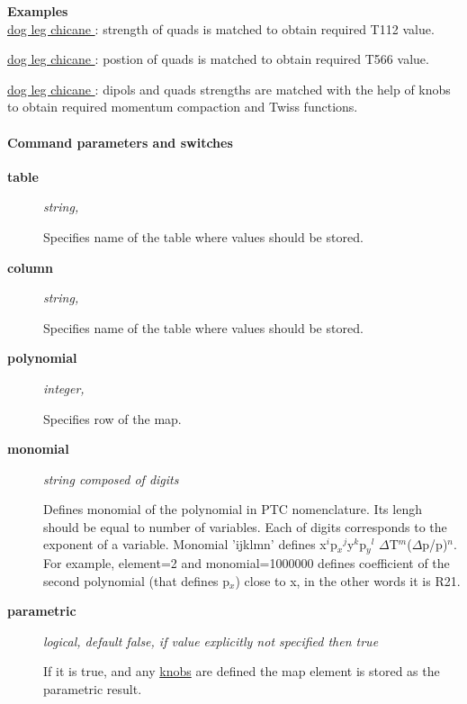 \textbf{ Examples} \\

\href{http://cern.ch/frs/mad-X_examples/ptc_madx_interface/ptc_secordmatch/chicane.madx}{  dog leg chicane } : strength of quads is matched to obtain required T112 value.   

\href{http://cern.ch/frs/mad-X_examples/ptc_madx_interface/eplacement/chicane.madx}{  dog leg chicane } : postion of quads is matched to obtain required T566 value.  

\href{http://cern.ch/frs/mad-X_examples/ptc_madx_interface/matchwithknobs/matchwithknobs.madx}{  dog leg chicane } : dipols and quads strengths are matched with the help of knobs to obtain required momentum compaction and Twiss functions.  

\paragraph{ Command parameters and switches }
\begin{description}
	\item[\textbf{ table }] \textit{ string, }

 Specifies name of the table where values should be stored.   
	\item[\textbf{ column }] \textit{ string, }

 Specifies name of the table where values should be stored.   
	\item[\textbf{ polynomial }] \textit{ integer, }

 Specifies row of the map.   
	\item[\textbf{ monomial }] \textit{ string composed of digits }

 Defines monomial of the polynomial in PTC nomenclature.        Its lengh should be equal to number of variables. Each of digits corresponds       to the exponent of a variable. Monomial 'ijklmn' defines        x$^i$p$_x$$^j$y$^k$p$_y$$^l$       $\Delta$T$^m$($\Delta$p/p)$^n$.       For example, element=2 and monomial=1000000       defines coefficient of the second polynomial (that defines p$_x$)        close to x, in the other words it is R21.      
	\item[\textbf{ parametric }] \textit{ logical, default false, if value explicitly not specified then true}

 If it is true, and any       \href{PTC_Knob.html}{knobs}        are defined the map element is stored as the parametric result.           
\end{description}

